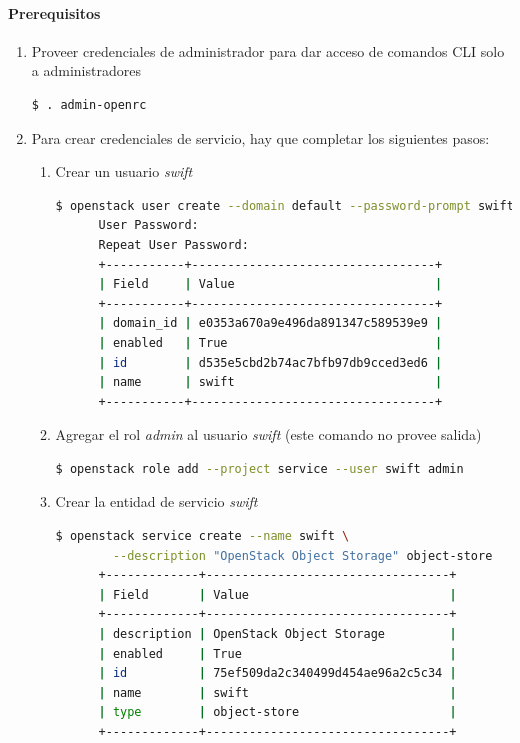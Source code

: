 \documentclass{article}
\begin{document}
\paragraph{Prerequisitos}
\begin{enumerate}
  \item Proveer credenciales de administrador para dar acceso de comandos CLI solo a administradores
  \begin{lstlisting}[language=bash]
    $ . admin-openrc
  \end{lstlisting}
  
  \item Para crear credenciales de servicio, hay que completar los siguientes pasos:
  \begin{enumerate}
    \item Crear un usuario \emph{swift}
    \begin{lstlisting}[language=bash]
      $ openstack user create --domain default --password-prompt swift
      User Password:
      Repeat User Password:
      +-----------+----------------------------------+
      | Field     | Value                            |
      +-----------+----------------------------------+
      | domain_id | e0353a670a9e496da891347c589539e9 |
      | enabled   | True                             |
      | id        | d535e5cbd2b74ac7bfb97db9cced3ed6 |
      | name      | swift                            |
      +-----------+----------------------------------+
    \end{lstlisting}
    
    \item Agregar el rol \emph{admin} al usuario \emph{swift} (este comando no provee salida)
    \begin{lstlisting}[language=bash]
      $ openstack role add --project service --user swift admin
    \end{lstlisting}
    
    \item Crear la entidad de servicio \emph{swift}
    \begin{lstlisting}[language=bash]
      $ openstack service create --name swift \
        --description "OpenStack Object Storage" object-store
      +-------------+----------------------------------+
      | Field       | Value                            |
      +-------------+----------------------------------+
      | description | OpenStack Object Storage         |
      | enabled     | True                             |
      | id          | 75ef509da2c340499d454ae96a2c5c34 |
      | name        | swift                            |
      | type        | object-store                     |
      +-------------+----------------------------------+
    \end{lstlisting}
  \end{enumerate}


\end{enumerate}
\end{document}
